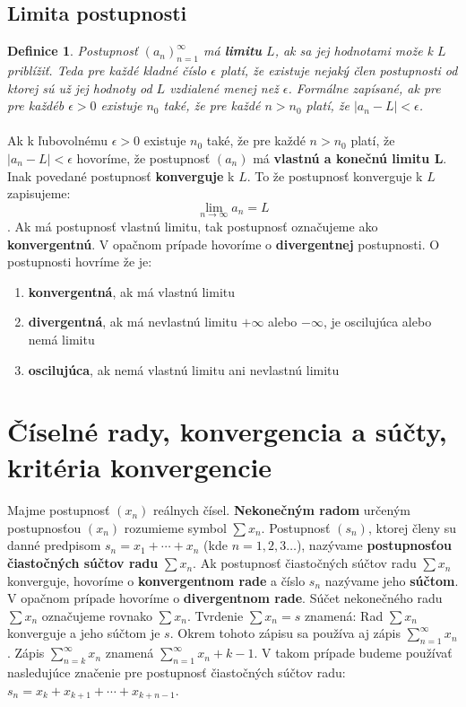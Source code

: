 \documentclass[12pt,a4paper]{article}
\newtheorem{definition}{Definice}
\begin{document}
\subsection{Limita postupnosti}
\begin{definition}
	Postupnosť $(a_{n})_{n=1}^{\infty}$ má \textbf{limitu} $L$, ak sa jej hodnotami može k $L$ priblížiť. Teda pre každé kladné číslo $\epsilon$ platí, že existuje nejaký člen postupnosti od ktorej sú už jej hodnoty od $L$ vzdialené menej než $\epsilon$. Formálne zapísané, ak pre pre každéb $\epsilon>0$ existuje $n_{0}$ také, že pre každé $n>n_{0}$ platí, že $|a_{n}-L|<\epsilon$.
\end{definition}

\paragraph{}
Ak k ľubovolnému $\epsilon>0$ existuje $n_{0}$ také, že pre každé $n>n_{0}$ platí, že $|a_{n}-L|<\epsilon$ hovoríme, že postupnosť $(a_{n})$ má \textbf{vlastnú a konečnú limitu L}. Inak povedané postupnosť \textbf{konverguje} k $L$. To že postupnosť konverguje k $L$ zapisujeme: $$\lim_{n\rightarrow \infty} a_{n}=L$$. Ak má postupnosť vlastnú limitu, tak postupnosť označujeme ako \textbf{konvergentnú}. V opačnom prípade hovoríme o \textbf{divergentnej} postupnosti. O postupnosti hovríme že je:

\begin{enumerate}
	\item \textbf{konvergentná}, ak má vlastnú limitu
	\item \textbf{divergentná}, ak má nevlastnú limitu $+\infty$ alebo $-\infty$, je oscilujúca alebo nemá limitu
	\item \textbf{oscilujúca}, ak nemá vlastnú limitu ani nevlastnú limitu
\end{enumerate}

\section{Číselné rady, konvergencia a súčty, kritéria konvergencie}
\paragraph{}
Majme postupnosť $(x_{n})$ reálnych čísel. \textbf{Nekonečným radom} určeným postupnosťou $(x_{n})$ rozumieme symbol $\sum x_{n}$. Postupnosť $(s_{n})$, ktorej členy su danné predpisom $s_{n}=x_{1} + \dotsm + x_{n}$ (kde $n=1, 2, 3 \dots$), nazývame \textbf{postupnosťou čiastočných súčtov radu} $\sum x_{n}$. Ak postupnosť čiastočných súčtov radu $\sum x_{n}$ konverguje, hovoríme o \textbf{konvergentnom rade} a číslo $s_{n}$ nazývame jeho \textbf{súčtom}. V opačnom prípade hovoríme o \textbf{divergentnom rade}. Súčet nekonečného radu $\sum x_{n}$ označujeme rovnako $\sum x_{n}$. Tvrdenie $\sum x_{n}=s$ znamená: Rad $\sum x_{n}$ konverguje a jeho súčtom je $s$. Okrem tohoto zápisu sa používa aj zápis $\sum_{n=1}^{\infty} x_{n}$. Zápis $\sum_{n=k}^{\infty} x_{n}$ znamená $\sum_{n=1}^{\infty} x_{n}+k-1$. V takom prípade budeme používať nasledujúce značenie pre postupnosť čiastočných súčtov radu: $s_{n}=x_{k}+x_{k+1}+\dotsm + x_{k+n-1}$.
\end{document}
